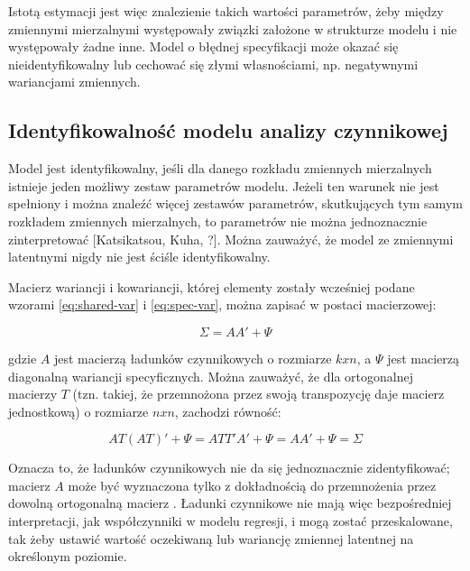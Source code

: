 \documentclass[12pt]{article}
\begin{document}
Istotą estymacji jest więc znalezienie takich wartości parametrów, żeby między zmiennymi mierzalnymi występowały związki założone w strukturze modelu i nie występowały żadne inne. Model o błędnej specyfikacji może okazać się nieidentyfikowalny lub cechować się złymi własnościami, np. negatywnymi wariancjami zmiennych.

\hypertarget{identyfikowalnoux15bux107-modelu-analizy-czynnikowej}{%
\subsection{Identyfikowalność modelu analizy czynnikowej}\label{identyfikowalnoux15bux107-modelu-analizy-czynnikowej}}

Model jest identyfikowalny, jeśli dla danego rozkładu zmiennych mierzalnych istnieje jeden możliwy zestaw parametrów modelu. Jeżeli ten warunek nie jest spełniony i można znaleźć więcej zestawów parametrów, skutkujących tym samym rozkładem zmiennych mierzalnych, to parametrów nie można jednoznacznie zinterpretować {[}Katsikatsou, Kuha, ?{]}. Można zauważyć, że model ze zmiennymi latentnymi nigdy nie jest ściśle identyfikowalny.

Macierz wariancji i kowariancji, której elementy zostały wcześniej podane wzorami \ref{eq:shared-var} i \ref{eq:spec-var}, można zapisać w postaci macierzowej:

\begin{equation}
\label{eq:var-matrix}
\Sigma = A A' + \Psi
\end{equation}

gdzie \(A\) jest macierzą ładunków czynnikowych o rozmiarze \(k x n\), a \(\Psi\) jest macierzą diagonalną wariancji specyficznych. Można zauważyć, że dla ortogonalnej macierzy \(T\) (tzn. takiej, że przemnożona przez swoją transpozycję daje macierz jednostkową) o rozmiarze \(n x n\), zachodzi równość:

\begin{equation}
\label{eq:scaling}
A T (A T)' + \Psi = A T T' A' + \Psi = A A' + \Psi = \Sigma
\end{equation}

Oznacza to, że ładunków czynnikowych nie da się jednoznacznie zidentyfikować; macierz \(A\) może być wyznaczona tylko z dokładnością do przemnożenia przez dowolną ortogonalną macierz \citep{Shapiro}. Ładunki czynnikowe nie mają więc bezpośredniej interpretacji, jak współczynniki w modelu regresji, i mogą zostać przeskalowane, tak żeby ustawić wartość oczekiwaną lub wariancję zmiennej latentnej na określonym poziomie.
\end{document}
